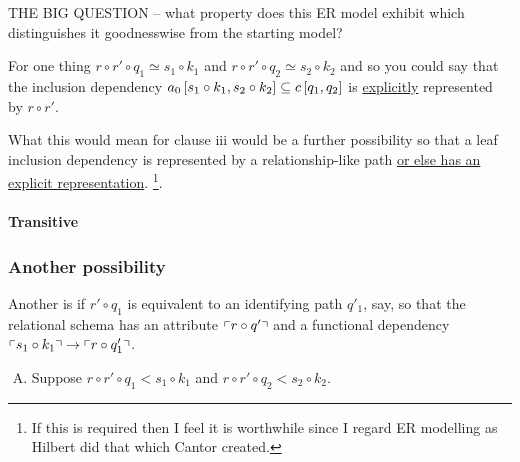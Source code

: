 {\large THE BIG QUESTION -- what property does this ER model exhibit which distinguishes it goodnesswise from the starting model?}

For one thing $r \circ r' \circ q_1 \simeq s_1 \circ k_1$ and $r \circ r' \circ q_2 \simeq s_2 \circ k_2$
and so you could say that the inclusion dependency $a_0\left[s_1 \circ k_1,s_2 \circ k_2\right]\subseteq c\left[q_1,q_2\right]$ 
is \underline{explicitly} represented by $r \circ r'$. 

What this would mean for clause iii would be a further possibility so that a leaf inclusion dependency is 
represented by a relationship-like path \underline{or else has an explicit representation}. 
\footnote{If this is required then I feel it is worthwhile since I regard ER modelling as Hilbert did that which Cantor created. }.

\paragraph{Transitive}

\vspace {0.5cm}
\subsubsection{Another possibility}
Another is if $r' \circ q_1$ is equivalent to an identifying path $q'_1$, say, so that the relational schema
has an attribute $\left\ulcorner r \circ q'\right\urcorner$ and a functional dependency $\left\ulcorner s_1 \circ k_1\right\urcorner \rightarrow \left\ulcorner r \circ q'_1\right\urcorner$. \\

\vspace {0.5cm}

\begin{enumerate}[(A)]
\item Suppose $r \circ r' \circ q_1 < s_1 \circ k_1$ and $r \circ r' \circ q_2 < s_2 \circ k_2$. 

\end{enumerate}

